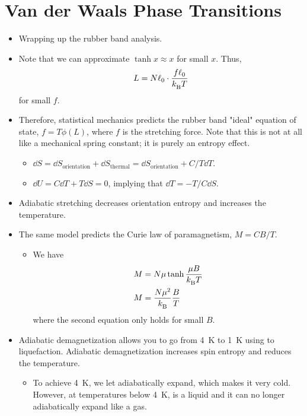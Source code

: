 \documentclass[../notes.tex]{subfiles}
\begin{document}
\section{Van der Waals Phase Transitions}
\begin{itemize}
    \item {}Wrapping up the rubber band analysis.
    \item Note that we can approximate $\tanh x\approx x$ for small $x$. Thus,
    \begin{equation*}
        L = N\ell_0\cdot\frac{f\ell_0}{{k_\text{B}^{}} T}
    \end{equation*}
    for small $f$.
    \item Therefore, statistical mechanics predicts the rubber band "ideal" equation of state, $f=T\phi(L)$, where $f$ is the stretching force. Note that this is not at all like a mechanical spring constant; it is purely an entropy effect.
    \begin{itemize}
        \item $\dd{S}=\dd{S_\text{orientation}}+\dd{S_\text{thermal}}=\dd{S_\text{orientation}}+C/T\dd{T}$.
        \item $\dd{U}=C\dd{T}+T\dd{S}=0$, implying that $\dd{T}=-T/C\dd{S}$.
    \end{itemize}
    \item Adiabatic stretching decreases orientation entropy and increases the temperature.
    \item The same model predicts the Curie law of paramagnetism, $M=CB/T$.
    \begin{itemize}
        \item We have
        \begin{align*}
            M &= N\mu\tanh\frac{\mu B}{{k_\text{B}^{}} T}\\
            M &= \frac{N\mu^2}{{k_\text{B}^{}}}\frac{B}{T}
        \end{align*}
        where the second equation only holds for small $B$.
    \end{itemize}
    \item Adiabatic demagnetization allows you to go from \SI{4}{\kelvin} to \SI{1}{\kelvin} using  to  liquefaction. Adiabatic demagnetization increases spin entropy and reduces the temperature.
    \begin{itemize}
        \item To achieve \SI{4}{\kelvin}, we let  adiabatically expand, which makes it very cold. However, at temperatures below \SI{4}{\kelvin},  is a liquid and it can no longer adiabatically expand like a gas.

\end{itemize}
\end{itemize}
\end{document}
